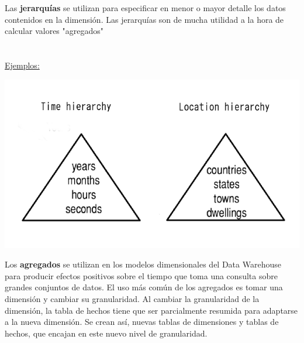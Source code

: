 \documentclass{fancyslides}
\begin{document}
\begin{frame}
\misc
{
  Las \textbf{jerarquías} se utilizan para especificar en menor o mayor detalle los datos contenidos en la dimensión. Las jerarquías son de mucha utilidad a la hora de calcular valores "agregados"\\ \ \\ \ \\

  \underline{Ejemplos:}
  \begin{center}
  \includegraphics[scale=0.3]{jerarquias}
  \end{center}
}
\end{frame}


\begin{frame}
\end{frame}

\begin{frame}
\misc
{
Los \textbf{agregados} se utilizan en los modelos dimensionales del Data Warehouse para producir efectos positivos sobre el tiempo que toma una consulta sobre grandes conjuntos de datos. El uso más común de los agregados es tomar una dimensión y cambiar su granularidad.
Al cambiar la granularidad de la dimensión, la tabla de hechos tiene que ser parcialmente resumida para adaptarse a la nueva dimensión. Se crean así, nuevas tablas de dimensiones y tablas de hechos, que encajan en este nuevo nivel de granularidad.
}
\end{frame}
\end{document}
